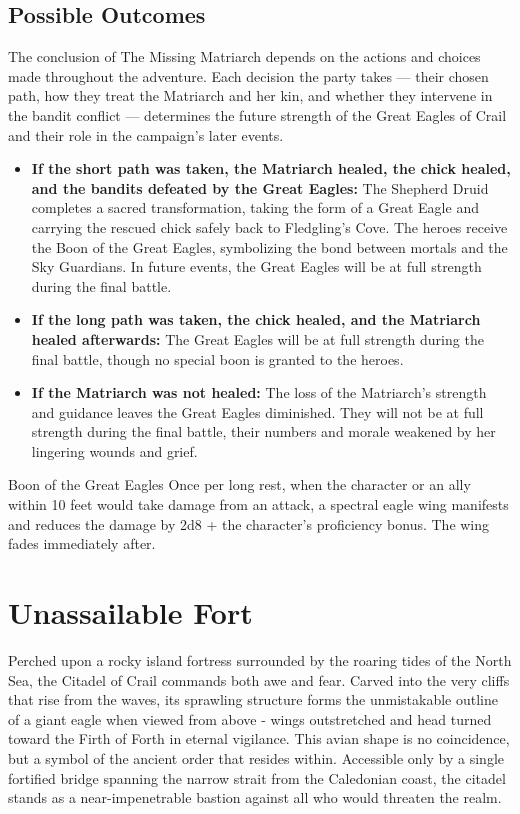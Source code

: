 \subsection*{Possible Outcomes}
{\entryfont The conclusion of The Missing Matriarch depends on the actions and choices made throughout the adventure. Each decision the party takes — their chosen path, how they treat the Matriarch and her kin, and whether they intervene in the bandit conflict — determines the future strength of the Great Eagles of Crail and their role in the campaign's later events.
\begin{itemize}
	\item \textbf{If the short path was taken, the Matriarch healed, the chick healed, and the bandits defeated by the Great Eagles:} The Shepherd Druid completes a sacred transformation, taking the form of a Great Eagle and carrying the rescued chick safely back to Fledgling's Cove. The heroes receive the Boon of the Great Eagles, symbolizing the bond between mortals and the Sky Guardians. In future events, the Great Eagles will be at full strength during the final battle.
	\item \textbf{If the long path was taken, the chick healed, and the Matriarch healed afterwards:} The Great Eagles will be at full strength during the final battle, though no special boon is granted to the heroes.
	\item \textbf{If the Matriarch was not healed:} The loss of the Matriarch's strength and guidance leaves the Great Eagles diminished. They will not be at full strength during the final battle, their numbers and morale weakened by her lingering wounds and grief.
\end{itemize}}
\begingroup
	\DndSetThemeColor[PhbMauve]
	\begin{DndComment}{Boon of the Great Eagles}
		Once per long rest, when the character or an ally within 10 feet would take damage from an attack, a spectral eagle wing manifests and reduces the damage by 2d8 + the character's proficiency bonus. The wing fades immediately after.
	\end{DndComment}
\endgroup

\section*{Unassailable Fort}
{\entryfont Perched upon a rocky island fortress surrounded by the roaring tides of the North Sea, the Citadel of Crail commands both awe and fear. Carved into the very cliffs that rise from the waves, its sprawling structure forms the unmistakable outline of a giant eagle when viewed from above - wings outstretched and head turned toward the Firth of Forth in eternal vigilance. This avian shape is no coincidence, but a symbol of the ancient order that resides within. Accessible only by a single fortified bridge spanning the narrow strait from the Caledonian coast, the citadel stands as a near-impenetrable bastion against all who would threaten the realm.}

